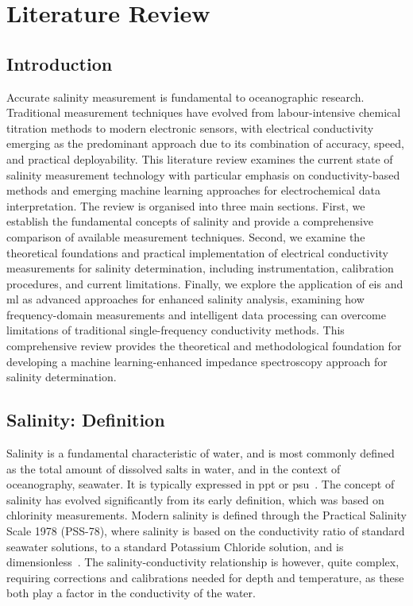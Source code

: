 \chapter{Literature Review}
\section{Introduction}
Accurate salinity measurement is fundamental to oceanographic research.
Traditional measurement techniques have evolved from labour-intensive chemical titration methods to modern electronic sensors, with electrical conductivity emerging as the predominant approach due to its combination of accuracy, speed, and practical deployability.
This literature review examines the current state of salinity measurement technology with particular emphasis on conductivity-based methods and emerging machine learning approaches for electrochemical data interpretation. The review is organised into three main sections.
First, we establish the fundamental concepts of salinity and provide a comprehensive comparison of available measurement techniques.
Second, we examine the theoretical foundations and practical implementation of electrical conductivity measurements for salinity determination, including instrumentation, calibration procedures, and current limitations.
Finally, we explore the application of \gls{eis} and \gls{ml} as advanced approaches for enhanced salinity analysis, examining how frequency-domain measurements and intelligent data processing can overcome limitations of traditional single-frequency conductivity methods.
This comprehensive review provides the theoretical and methodological foundation for developing a machine learning-enhanced impedance spectroscopy approach for salinity determination.

\section{Salinity: Definition}
Salinity is a fundamental characteristic of water, and is most commonly defined as the total amount of dissolved salts in water, and in the context of oceanography, seawater.
It is typically expressed in \gls{ppt} or \gls{psu}~\cite{salinity_def}. 
The concept of salinity has evolved significantly from its early definition, which was based on chlorinity measurements.
Modern salinity is defined through the Practical Salinity Scale 1978 (PSS-78), where salinity is based on the conductivity ratio of standard seawater solutions, to a standard Potassium Chloride solution, and is dimensionless~\cite{unesco_salinity}.
The salinity-conductivity relationship is however, quite complex, requiring corrections and calibrations needed for depth and temperature, as these both play a factor in the conductivity of the water. 

